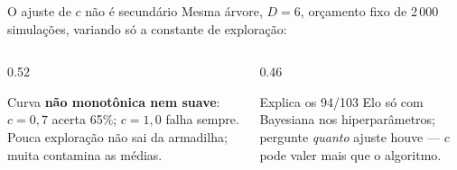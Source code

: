 \documentclass[aspectratio=169, 10pt]{beamer}
\begin{document}
\begin{frame}{O ajuste de $c$ não é secundário}
  \footnotesize
  Mesma árvore, $D=6$, orçamento fixo de 2\,000 simulações, variando só a constante de exploração:

  \medskip
  \centering

  \medskip
  \begin{columns}[T]
    \begin{column}{0.52\textwidth}
      \begin{alertabox}
        Curva \textbf{não monotônica nem suave}: $c=0{,}7$ acerta 65\%; $c=1{,}0$ falha sempre. Pouca exploração não sai da armadilha; muita contamina as médias.
      \end{alertabox}
    \end{column}
    \begin{column}{0.46\textwidth}
      \begin{ideiabox}
        Explica os 94/103 Elo só com Bayesiana nos hiperparâmetros; pergunte \emph{quanto} ajuste houve — $c$ pode valer mais que o algoritmo.
      \end{ideiabox}
    \end{column}
  \end{columns}
\end{frame}
\end{document}
